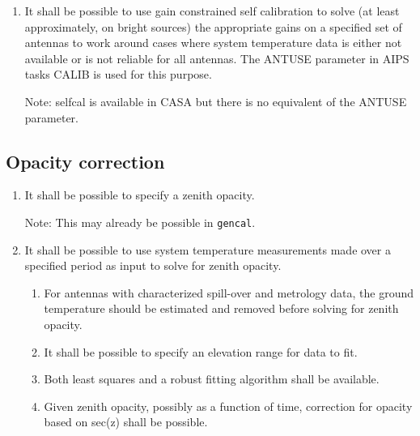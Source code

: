 \documentclass[11pt,a4paper]{article}
\begin{document}
\begin{enumerate}[subseclist]

  \item It shall be possible to use gain constrained self calibration
    to solve (at least approximately, on bright sources) the
    appropriate gains on a specified set of antennas to work around
    cases where system temperature data is either not available or is
    not reliable for all antennas. The ANTUSE parameter in AIPS tasks
    CALIB is used for this purpose.

    Note: selfcal is available in CASA but there is no equivalent of
    the ANTUSE parameter.

\end{enumerate}


\subsection{Opacity correction}

\begin{enumerate}[subseclist]

\item It shall be possible to specify a zenith opacity.

  Note: This may already be possible in \texttt{gencal}.

\item It shall be possible to use system temperature measurements made
  over a specified period as input to solve for zenith opacity.

  \begin{enumerate}[subsecsublist]

  \item For antennas with characterized spill-over and metrology data,
    the ground temperature should be estimated and removed before
    solving for zenith opacity.

  \item It shall be possible to specify an elevation range for data to
    fit.

  \item Both least squares and a robust fitting algorithm shall be available.

  \item Given zenith opacity, possibly as a function of time,
    correction for opacity based on sec(z) shall be possible.
    
  \end{enumerate}
  
\end{enumerate}
\end{document}
